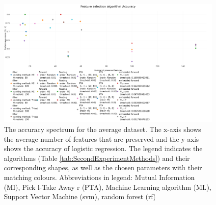 \documentclass[10pt,a4paper]{report}
\begin{document}
	\begin{figure}[H]
		\centering
		\includegraphics[angle=90,height=1.4\textwidth]{Accuracy_new.png}
		\caption{The accuracy spectrum for the average dataset. The x-axis shows the average number of features that are preserved and the y-axis shows the accuracy of logistic regression. The legend indicates the algorithms (Table \ref{tab:SecondExperimentMethods}) and their corresponding shapes, as well as the chosen parameters with their matching colours. Abbreviations in legend: Mutual Information (MI), Pick l-Take Away r (PTA), Machine Learning algorithm (ML), Support Vector Machine (svm), random forest (rf)}
		\label{fig:Avg_Accuracy_Spectrum}
	\end{figure}
	
\end{document}
